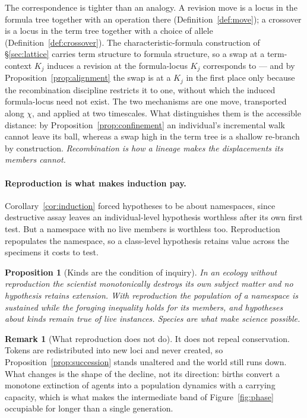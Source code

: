 \documentclass[11pt]{article}
\theoremstyle{plain}
\newtheorem{proposition}[theorem]{Proposition}
\theoremstyle{definition}
\newtheorem{remark}[theorem]{Remark}
\begin{document}
\label{sec:transport}%
The correspondence is tighter than an analogy. A revision move is a locus in the formula tree together
with an operation there (Definition~\ref{def:move}); a crossover is a locus in the term tree together
with a choice of allele (Definition~\ref{def:crossover}). The characteristic-formula construction of
\S\ref{sec:lattice} carries term structure to formula structure, so a swap at a term-context $K_j$
induces a revision at the formula-locus $K_j$ corresponds to --- and by
Proposition~\ref{prop:alignment} the swap is at a $K_j$ in the first place only because the
recombination discipline restricts it to one, without which the induced formula-locus need not
exist. The two mechanisms are one move,
transported along $\chi$, and applied at two timescales. What distinguishes them is the accessible
distance: by Proposition~\ref{prop:confinement} an individual's incremental walk cannot leave its ball,
whereas a swap high in the term tree is a shallow re-branch by construction. \emph{Recombination is how
a lineage makes the displacements its members cannot.}

\paragraph{Reproduction is what makes induction pay.} Corollary~\ref{cor:induction} forced hypotheses
to be about namespaces, since destructive assay leaves an individual-level hypothesis worthless after
its own first test. But a namespace with no live members is worthless too. Reproduction repopulates
the namespace, so a class-level hypothesis retains value across the specimens it costs to test.

\begin{proposition}[Kinds are the condition of inquiry]
\label{prop:kinds}
In an ecology without reproduction the scientist monotonically destroys its own subject matter and no
hypothesis retains extension. With reproduction the population of a namespace is sustained while the
foraging inequality holds for its members, and hypotheses about kinds remain true of live instances.
Species are what make science possible.
\end{proposition}

\begin{remark}[What reproduction does not do]
\label{rem:nofix}
It does not repeal conservation. Tokens are redistributed into new loci and never created, so
Proposition~\ref{prop:succession} stands unaltered and the world still runs down. What changes is the
shape of the decline, not its direction: births convert a monotone extinction of agents into a
population dynamics with a carrying capacity, which is what makes the intermediate band of
Figure~\ref{fig:phase} occupiable for longer than a single generation.
\end{remark}
\end{document}
